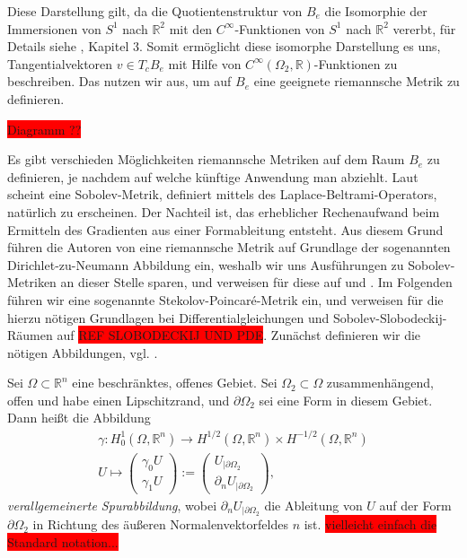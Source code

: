Diese Darstellung gilt, da die Quotientenstruktur von $B_e$ die Isomorphie der Immersionen von $S^1$ nach $\mathbb{R}^2$ mit den $C^\infty$-Funktionen von $S^1$ nach $\mathbb{R}^2$ vererbt, für Details siehe \cite{shape_space}, Kapitel 3.
Somit ermöglicht diese isomorphe Darstellung es uns, Tangentialvektoren $v \in T_cB_e$ mit Hilfe von $C^\infty(\Omega_2, \mathbb{R})$-Funktionen zu beschreiben. Das nutzen wir aus, um auf $B_e$ eine geeignete riemannsche Metrik zu definieren.

\colorbox{red}{Diagramm ??}

Es gibt verschieden Möglichkeiten riemannsche Metriken auf dem Raum $B_e$ zu definieren, je nachdem auf welche künftige Anwendung man abziehlt. Laut \cite{shape_space} scheint eine Sobolev-Metrik, definiert mittels des Laplace-Beltrami-Operators, natürlich zu erscheinen. Der Nachteil ist, das erheblicher Rechenaufwand beim Ermitteln des Gradienten aus einer Formableitung entsteht. Aus diesem Grund führen die Autoren von \cite{bfgs1} eine riemannsche Metrik auf Grundlage der sogenannten Dirichlet-zu-Neumann Abbildung ein, weshalb wir uns Ausführungen zu Sobolev-Metriken an dieser Stelle sparen, und verweisen für diese auf \cite{bfgs1} und \cite{shape_space}. Im Folgenden führen wir eine sogenannte Stekolov-Poincaré-Metrik ein, und verweisen für die hierzu nötigen Grundlagen bei Differentialgleichungen und Sobolev-Slobodeckij-Räumen auf \colorbox{red}{REF SLOBODECKIJ UND PDE}. Zunächst definieren wir die nötigen Abbildungen, vgl. \cite{bfgs1}.

\begin{defi}\label{Sproperatoren}
Sei $\Omega \subset \mathbb{R}^n$ eine beschränktes, offenes Gebiet. Sei $\Omega_2 \subset \Omega$ zusammenhängend, offen und habe einen Lipschitzrand, und $\partial \Omega_2$ sei eine Form in diesem Gebiet. Dann heißt die Abbildung
\begin{align*}
	\gamma: H^{1}_0(\Omega, \mathbb{R}^n) \rightarrow H^{1/2}(\Omega, \mathbb{R}^n)\times H^{-1/2}(\Omega, \mathbb{R}^n) \\
	U \mapsto 
	\left(\begin{matrix}
	\gamma_0 U \\ \gamma_1 U
	\end{matrix}\right)
	:= \left(\begin{matrix}
	U_{\vert \partial\Omega_2} \\ \partial_n U_{\vert \partial\Omega_2}
	\end{matrix}\right),
\end{align*}
\textit{verallgemeinerte Spurabbildung}, wobei $\partial_n U_{\vert\partial\Omega_2}$ die Ableitung von $U$ auf der Form $\partial \Omega_2$ in Richtung des äußeren Normalenvektorfeldes $n$ ist. \colorbox{red}{vielleicht einfach die Standard notation...}
\end{defi}

